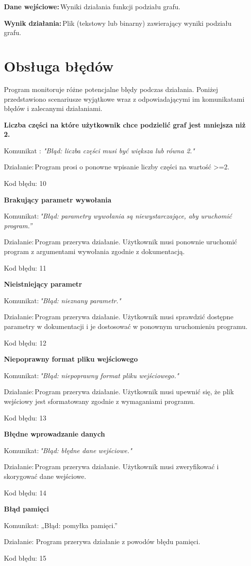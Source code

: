 \documentclass[a4paper,12pt]{article}
\begin{document}
\textbf{Dane wejściowe:} Wyniki działania funkcji podziału grafu. 

\textbf{Wynik działania:} Plik (tekstowy lub binarny) zawierający wyniki podziału grafu. 

\newpage
\section{{Obsługa błędów} }

Program monitoruje różne potencjalne błędy podczas działania. Poniżej przedstawiono scenariusze wyjątkowe wraz z odpowiadającymi im komunikatami błędów i zalecanymi działaniami. 

{\textbf{Liczba części na które użytkownik chce podzielić graf jest mniejsza niż 2.}}

Komunikat : \textit{"Błąd: liczba części musi być większa lub równa 2."} 

Działanie: Program prosi o ponowne wpisanie liczby części na wartość >=2. 

Kod błędu: 10 



\textbf{Brakujący parametr wywołania}

Komunikat: \textit{"Błąd: parametry wywołania są niewystarczające, aby uruchomić program.”} 

Działanie: Program przerywa działanie. Użytkownik musi ponownie uruchomić program z argumentami wywołania zgodnie z dokumentacją. 

Kod błędu: 11 



\textbf{Nieistniejący parametr} 

Komunikat: \textit{"Błąd: nieznany parametr."} 

Działanie: Program przerywa działanie. Użytkownik musi sprawdzić dostępne parametry w dokumentacji i je dostosować w ponownym uruchomieniu programu. 

Kod błędu: 12 



\textbf{Niepoprawny format pliku wejściowego} 

Komunikat: \textit{"Błąd: niepoprawny format pliku wejściowego."} 

Działanie: Program przerywa działanie. Użytkownik musi upewnić się, że plik wejściowy jest sformatowany zgodnie z wymaganiami programu. 

Kod błędu: 13 



\textbf{Błędne wprowadzanie danych} 

Komunikat: \textit{"Błąd: błędne dane wejściowe."} 

Działanie: Program przerywa działanie. Użytkownik musi zweryfikować i skorygować dane wejściowe. 

Kod błędu: 14 



\textbf{Błąd pamięci} 

Komunikat: „Błąd: pomyłka pamięci.” 

Działanie: Program przerywa działanie z powodów błędu pamięci. 

Kod błędu: 15 
\end{document}
